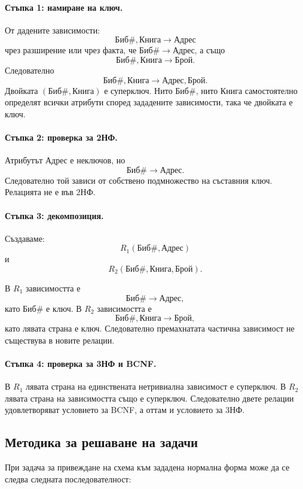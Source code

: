 \paragraph{Стъпка 1: намиране на ключ.}
От дадените зависимости:
\[
\mathrm{Биб\#},\mathrm{Книга}\to\mathrm{Адрес}
\]
чрез разширение или чрез факта, че $\mathrm{Биб\#}\to\mathrm{Адрес}$, а също
\[
\mathrm{Биб\#},\mathrm{Книга}\to\mathrm{Брой}.
\]
Следователно
\[
\mathrm{Биб\#},\mathrm{Книга}
\to
\mathrm{Адрес},\mathrm{Брой}.
\]
Двойката $(\mathrm{Биб\#},\mathrm{Книга})$ е суперключ. Нито $\mathrm{Биб\#}$, нито $\mathrm{Книга}$ самостоятелно определят всички атрибути според зададените зависимости, така че двойката е ключ.

\paragraph{Стъпка 2: проверка за 2НФ.}
Атрибутът $\mathrm{Адрес}$ е неключов, но
\[
\mathrm{Биб\#}\to\mathrm{Адрес}.
\]
Следователно той зависи от собствено подмножество на съставния ключ. Релацията не е във 2НФ.

\paragraph{Стъпка 3: декомпозиция.}
Създаваме:
\[
R_1(\mathrm{Биб\#},\mathrm{Адрес})
\]
и
\[
R_2(\mathrm{Биб\#},\mathrm{Книга},\mathrm{Брой}).
\]

В $R_1$ зависимостта е
\[
\mathrm{Биб\#}\to\mathrm{Адрес},
\]
като $\mathrm{Биб\#}$ е ключ. В $R_2$ зависимостта е
\[
\mathrm{Биб\#},\mathrm{Книга}\to\mathrm{Брой},
\]
като лявата страна е ключ. Следователно премахнатата частична зависимост не съществува в новите релации.

\paragraph{Стъпка 4: проверка за 3НФ и BCNF.}
В $R_1$ лявата страна на единствената нетривиална зависимост е суперключ. В $R_2$ лявата страна на зависимостта също е суперключ. Следователно двете релации удовлетворяват условието за BCNF, а оттам и условието за 3НФ.

\subsection{Методика за решаване на задачи}\label{s:24.1.16}

При задача за привеждане на схема към зададена нормална форма може да се следва следната последователност:

